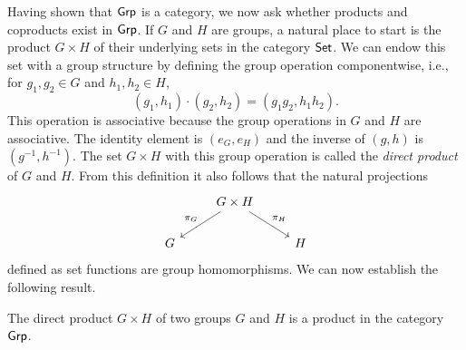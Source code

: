 Having shown that \(\mathsf{Grp}\) is a category, we now ask whether products and
coproducts exist in \(\mathsf{Grp}\). If \(G\) and \(H\) are groups, a natural place to
start is the product \(G \times H\) of their underlying sets in the category
\(\mathsf{Set}\). We can endow this set with a group structure by defining the
group operation componentwise, i.e., for \(g_1, g_2 \in G\) and \(h_1, h_2 \in
H\),
\[
    (g_1, h_1) \cdot (g_2, h_2) = (g_1g_2, h_1h_2).
\]
This operation is associative because the group operations in \(G\) and \(H\)
are associative. The identity element is \((e_G, e_H)\) and the inverse of \((g,
h)\) is \((g^{-1}, h^{-1})\). The set \(G \times H\) with this group operation
is called the \emph{direct product} of \(G\) and \(H\). From this definition it
also follows that the natural projections
\[
        \begin{tikzcd}
            & G\times H \arrow[ld, "\pi_G"'] \arrow[rd, "\pi_H"] &   \\
          G &                                                    & H
          \end{tikzcd}
\]
defined as set functions are group homomorphisms. We can now establish the
following result.

\begin{theorem}
    The direct product \(G \times H\) of two groups \(G\) and \(H\) is a product
    in the category \(\mathsf{Grp}\).
\end{theorem}

